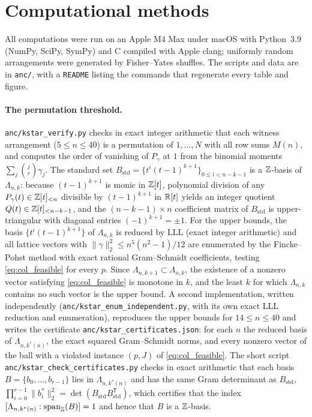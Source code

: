 \section{Computational methods}
\label{sec:appendix}

All computations were run on an Apple M4 Max under macOS with Python~3.9 (NumPy, SciPy, SymPy) and C compiled with Apple clang; uniformly random arrangements were generated by Fisher--Yates shuffles.
The scripts and data are in \texttt{anc/}, with a \texttt{README} listing the commands that regenerate every table and figure.

\paragraph{The permutation threshold.}
\texttt{anc/kstar\_verify.py} checks in exact integer arithmetic that each witness arrangement ($5\le n\le40$) is a permutation of $1,\dots,N$ with all row sums $M(n)$, and computes the order of vanishing of $P_\gamma$ at $1$ from the binomial moments $\sum_j\binom jr\gamma_j$.
The standard set $B_{\mathrm{std}} = \{t^i(t-1)^{k+1}\}_{0 \le i < n-k-1}$ is a $\mathbb{Z}$-basis of $\Lambda_{n,k}$: because $(t-1)^{k+1}$ is monic in $\mathbb{Z}[t]$, polynomial division of any $P_\gamma(t) \in \mathbb{Z}[t]_{<n}$ divisible by $(t-1)^{k+1}$ in $\mathbb{R}[t]$ yields an integer quotient $Q(t) \in \mathbb{Z}[t]_{<n-k-1}$, and the $(n-k-1)\times n$ coefficient matrix of $B_{\mathrm{std}}$ is upper-triangular with diagonal entries $(-1)^{k+1} = \pm 1$.
For the upper bounds, the basis $\{t^i(t-1)^{k+1}\}$ of $\Lambda_{n,k}$ is reduced by LLL (exact integer arithmetic) and all lattice vectors with $\|\gamma\|_2^2\le n^5(n^2-1)/12$ are enumerated by the Fincke--Pohst method with exact rational Gram--Schmidt coefficients, testing \eqref{eq:col_feasible} for every $p$.
Since $\Lambda_{n,k+1}\subset\Lambda_{n,k}$, the existence of a nonzero vector satisfying \eqref{eq:col_feasible} is monotone in $k$, and the least $k$ for which $\Lambda_{n,k}$ contains no such vector is the upper bound.
A second implementation, written independently (\texttt{anc/kstar\_enum\_independent.py}, with its own exact LLL reduction and enumeration), reproduces the upper bounds for $14\le n\le40$ and writes the certificate \texttt{anc/kstar\_certificates.json}: for each $n$ the reduced basis of $\Lambda_{n,k^*(n)}$, the exact squared Gram--Schmidt norms, and every nonzero vector of the ball with a violated instance $(p,J)$ of \eqref{eq:col_feasible}.
The short script \texttt{anc/kstar\_check\_certificates.py} checks in exact arithmetic that each basis $B = \{b_0,\dots,b_{r-1}\}$ lies in $\Lambda_{n,k^*(n)}$ and has the same Gram determinant as $B_{\mathrm{std}}$, $\prod_{i=0}^{r-1} \|b_i^*\|_2^2 = \det(B_{\mathrm{std}} B_{\mathrm{std}}^{\mathsf T})$, which certifies that the index $[\Lambda_{n,k^*(n)} : \mathrm{span}_{\mathbb{Z}}(B)] = 1$ and hence that $B$ is a $\mathbb{Z}$-basis.

